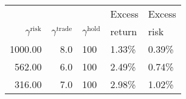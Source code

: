 \documentclass[openany]{article}  %
\begin{document}
\begin{table}
\begin{center}
\begin{tabular}{rrl|ll}
\toprule
&&&Excess&Excess\\
$\gamma^\mathrm{risk}$ &  $\gamma^\mathrm{trade}$ & $\gamma^\mathrm{hold}$ &  return &    risk \\
\midrule
 1000.00 &                      8.0 &                    100 &   1.33\% &   0.39\% \\
  562.00 &                      6.0 &                    100 &   2.49\% &   0.74\% \\
  316.00 &                      7.0 &                    100 &   2.98\% &   1.02\% \\

\end{tabular}
\end{center}
\end{table}
\end{document}
